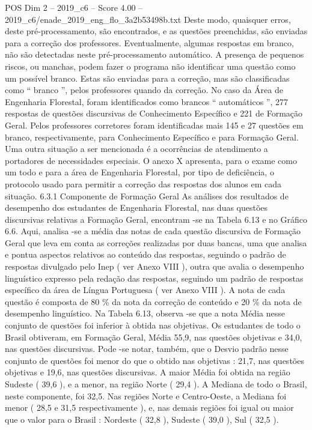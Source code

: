 \begin{textsample}{POS Dim 2 – 2019\_c6 – Score 4.00 – 2019\_c6/enade\_2019\_eng\_flo\_3a2b53498b.txt}
Deste modo, quaisquer erros, deste pré-processamento, são encontrados, e as questões preenchidas, são enviadas para a correção dos professores.
Eventualmente, algumas respostas em branco, não são detectadas neste pré-processamento automático.
A presença de pequenos riscos, ou manchas, podem fazer o programa não identificar uma questão como um possível branco.
Estas são enviadas para a correção, mas são classificadas como “ branco ”, pelos professores quando da correção.
No caso da Área de Engenharia Florestal, foram identificados como brancos “ automáticos ”, 277 respostas de questões discursivas de Conhecimento Específico e 221 de Formação Geral.
Pelos professores corretores foram identificadas mais 145 e 27 questões em branco, respectivamente, para Conhecimento Específico e para Formação Geral.
Uma outra situação a ser mencionada é a ocorrências de atendimento a portadores de necessidades especiais.
O anexo X apresenta, para o exame como um todo e para a área de Engenharia Florestal, por tipo de deficiência, o protocolo usado para permitir a correção das respostas dos alunos em cada situação. 6.3.1 Componente de Formação Geral As análises dos resultados de desempenho dos estudantes de Engenharia Florestal, nas duas questões discursivas relativas a Formação Geral, encontram -se na Tabela 6.13 e no Gráfico 6.6.
Aqui, analisa -se a média das notas de cada questão discursiva de Formação Geral que leva em conta as correções realizadas por duas bancas, uma que analisa e pontua aspectos relativos ao conteúdo das respostas, seguindo o padrão de respostas divulgado pelo Inep ( ver Anexo VIII ), outra que avalia o desempenho linguístico expresso pela redação das respostas, seguindo um padrão de respostas específico da área de Língua Portuguesa ( ver Anexo VIII ).
A nota de cada questão é composta de 80 \% da nota da correção de conteúdo e 20 \% da nota de desempenho linguístico.
Na Tabela 6.13, observa -se que a nota Média nesse conjunto de questões foi inferior à obtida nas objetivas.
Os estudantes de todo o Brasil obtiveram, em Formação Geral, Média 55,9, nas questões objetivas e 34,0, nas questões discursivas.
Pode -se notar, também, que o Desvio padrão nesse conjunto de questões foi menor do que o obtido nas objetivas : 21,7, nas questões objetivas e 19,6, nas questões discursivas.
A maior Média foi obtida na região Sudeste ( 39,6 ), e a menor, na região Norte ( 29,4 ).
A Mediana de todo o Brasil, neste componente, foi 32,5.
Nas regiões Norte e Centro-Oeste, a Mediana foi menor ( 28,5 e 31,5 respectivamente ), e, nas demais regiões foi igual ou maior que o valor para o Brasil : Nordeste ( 32,8 ), Sudeste ( 39,0 ), Sul ( 32,5 ).

\end{textsample}
